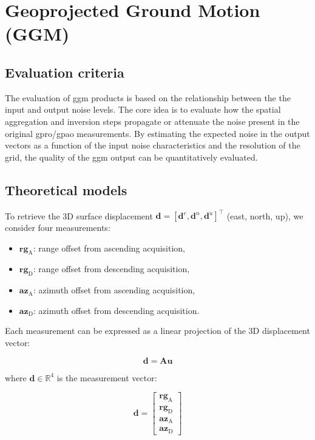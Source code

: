 \section{Geoprojected Ground Motion (GGM)}
\label{sec:ggm}

\subsection{Evaluation criteria}
\label{sec:ggm_criteria}

The evaluation of \acs{ggm} products is based on the relationship between the the input and output noise levels. The core idea is to evaluate how the spatial aggregation and inversion steps propagate or attenuate the noise present in the original \acs{gpro}/\acs{gpao} measurements. By estimating the expected noise in the output vectors as a function of the input noise characteristics and the resolution of the grid, the quality of the \acs{ggm} output can be quantitatively evaluated.

\subsection{Theoretical models}
\label{sec:ggm_models}
To retrieve the 3D surface displacement \(\mathbf{d} = [\textbf{d}^e, \textbf{d}^n, \textbf{d}^u]^\top\) (east, north, up), we consider four measurements:

\begin{itemize}
    \item \(\textbf{rg}_{\text{A}}\): range offset from ascending acquisition,
    \item \(\textbf{rg}_{\text{D}}\): range offset from descending acquisition,
    \item \(\textbf{az}_{\text{A}}\): azimuth offset from ascending acquisition,
    \item \(\textbf{az}_{\text{D}}\): azimuth offset from descending acquisition.
\end{itemize}

Each measurement can be expressed as a linear projection of the 3D displacement vector:

\[
\mathbf{d} = \mathbf{A} \mathbf{u}
\]

where \(\mathbf{d} \in \mathbb{R}^4\) is the measurement vector:

\[
\mathbf{d} =
\begin{bmatrix}
\textbf{rg}_{\text{A}} \\
\textbf{rg}_{\text{D}} \\
\textbf{az}_{\text{A}} \\
\textbf{az}_{\text{D}}
\end{bmatrix}
\]


